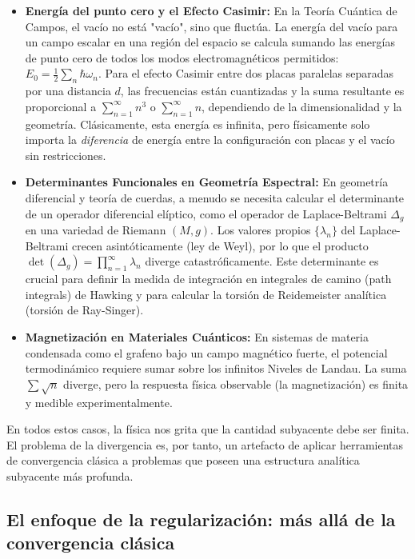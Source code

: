 \begin{itemize}
    \item \textbf{Energía del punto cero y el Efecto Casimir:} En la Teoría Cuántica de Campos, el vacío no está "vacío", sino que fluctúa. La energía del vacío para un campo escalar en una región del espacio se calcula sumando las energías de punto cero de todos los modos electromagnéticos permitidos: $E_0 = \frac{1}{2} \sum_n \hbar \omega_n$. Para el efecto Casimir entre dos placas paralelas separadas por una distancia $d$, las frecuencias están cuantizadas y la suma resultante es proporcional a $\sum_{n=1}^{\infty} n^3$ o $\sum_{n=1}^{\infty} n$, dependiendo de la dimensionalidad y la geometría. Clásicamente, esta energía es infinita, pero físicamente solo importa la \textit{diferencia} de energía entre la configuración con placas y el vacío sin restricciones.
    \item \textbf{Determinantes Funcionales en Geometría Espectral:} En geometría diferencial y teoría de cuerdas, a menudo se necesita calcular el determinante de un operador diferencial elíptico, como el operador de Laplace-Beltrami $\Delta_g$ en una variedad de Riemann $(M, g)$. Los valores propios $\{\lambda_n\}$ del Laplace-Beltrami crecen asintóticamente (ley de Weyl), por lo que el producto $\det(\Delta_g) = \prod_{n=1}^{\infty} \lambda_n$ diverge catastróficamente. Este determinante es crucial para definir la medida de integración en integrales de camino (path integrals) de Hawking y para calcular la torsión de Reidemeister analítica (torsión de Ray-Singer).
    \item \textbf{Magnetización en Materiales Cuánticos:} En sistemas de materia condensada como el grafeno bajo un campo magnético fuerte, el potencial termodinámico requiere sumar sobre los infinitos Niveles de Landau. La suma $\sum \sqrt{n}$ diverge, pero la respuesta física observable (la magnetización) es finita y medible experimentalmente.
\end{itemize}

En todos estos casos, la física nos grita que la cantidad subyacente debe ser finita. El problema de la divergencia es, por tanto, un artefacto de aplicar herramientas de convergencia clásica a problemas que poseen una estructura analítica subyacente más profunda.

\subsection{El enfoque de la regularización: más allá de la convergencia clásica}

